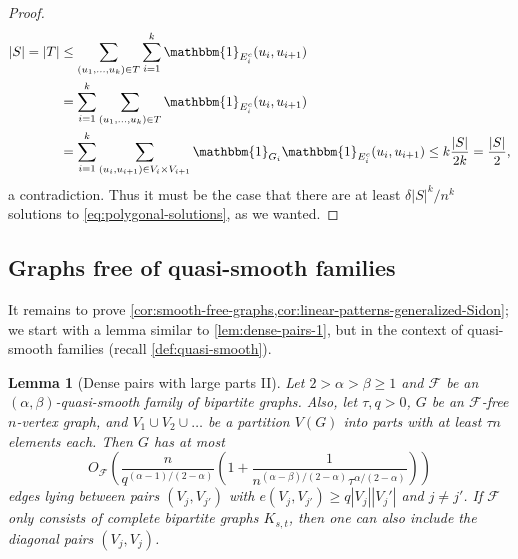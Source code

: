 \documentclass[reqno,11pt]{amsart}
\newtheorem{lemma}[theorem]{Lemma}
\theoremstyle{definition}
\theoremstyle{remark}
\numberwithin{equation}{section}
\newcommand{\mF}{\mathcal{F}}
\newcommand{\one}{\mathbbm{1}}
\begin{document}
\begin{proof}
\[
\begin{aligned}
    |S| = |T|
    &\le 
    \sum_{(u_1, \ldots, u_k) \in T} \sum_{i=1}^k \one_{E_i^c}(u_i, u_{i+1})
    \\
    &=
    \sum_{i=1}^k \sum_{(u_1, \ldots, u_k) \in T}  \one_{E_i^c}(u_i, u_{i+1})
    \\
    &= 
    \sum_{i=1}^k \sum_{(u_i, u_{i+1}) \in V_i \times V_{i+1}} \one_{G_i}\one_{E_i^c}(u_i, u_{i+1})
    \le 
    k \frac{|S|}{2k} = \frac{|S|}{2},
\end{aligned}
\]
a contradiction. Thus it must be the case that there are at least $\delta |S|^k/n^k$ solutions to \cref{eq:polygonal-solutions}, as we wanted.
\end{proof}





\subsection{Graphs free of quasi-smooth families}

It remains to prove \cref{cor:smooth-free-graphs,cor:linear-patterns-generalized-Sidon}; we start with a lemma similar to \cref{lem:dense-pairs-1}, but in the context of quasi-smooth families (recall \cref{def:quasi-smooth}).

\begin{lemma}[Dense pairs with large parts II] \label{lem:dense-pairs-2}
Let $2 > \alpha > \beta \ge 1$ and $\mF$ be an $(\alpha, \beta)$-quasi-smooth family of bipartite graphs. Also, let $\tau, q > 0$, $G$ be an $\mF$-free $n$-vertex graph, and $V_1 \cup V_2 \cup \ldots$ be a partition $V(G)$ into parts with at least $\tau n$ elements each. Then $G$ has at most
\[
    O_\mF\left(
    \frac{n}{q^{(\alpha-1)/(2-\alpha)}}
    \left(1 + \frac{1}{n^{(\alpha - \beta)/(2 - \alpha)} \tau^{\alpha/(2-\alpha)}}\right)\right)
\]
edges lying between pairs $(V_j, V_{j'})$ with $e(V_j, V_{j'}) \ge q |V_j| |V_j'|$ and $j \neq j'$. If $\mF$ only consists of complete bipartite graphs $K_{s,t}$, then one can also include the diagonal pairs $(V_j, V_j)$.
\end{lemma}
\end{document}
